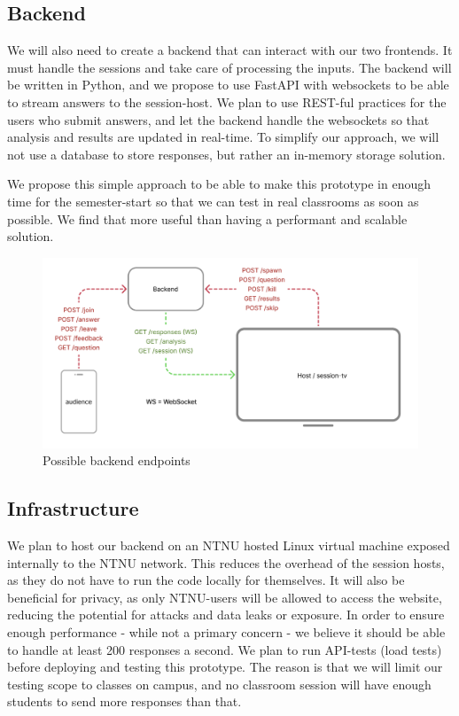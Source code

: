 \subsection{Backend}
We will also need to create a backend that can interact with our two frontends. It must handle the sessions and take care of processing the inputs. The backend will be written in Python, and we propose to use FastAPI with websockets to be able to stream answers to the session-host. We plan to use REST-ful practices for the users who submit answers, and let the backend handle the websockets so that analysis and results are updated in real-time. To simplify our approach, we will not use a database to store responses, but rather an in-memory storage solution.

We propose this simple approach to be able to make this prototype in enough time for the semester-start so that we can test in real classrooms as soon as possible. We find that more useful than having a performant and scalable solution. 

\begin{figure}[h!]
    \centering
    \includegraphics[width=1\linewidth]{figures//c5/backend.png}
    \caption{Possible backend endpoints}
    \label{fig:backend-endpoint-illustration}
\end{figure}

\subsection{Infrastructure}
We plan to host our backend on an NTNU hosted Linux virtual machine exposed internally to the NTNU network. This reduces the overhead of the session hosts, as they do not have to run the code locally for themselves. It will also be beneficial for privacy, as only NTNU-users will be allowed to access the website, reducing the potential for attacks and data leaks or exposure. In order to ensure enough performance - while not a primary concern - we believe it should be able to handle at least 200 responses a second. We plan to run API-tests (load tests) before deploying and testing this prototype. The reason is that we will limit our testing scope to classes on campus, and no classroom session will have enough students to send more responses than that.


